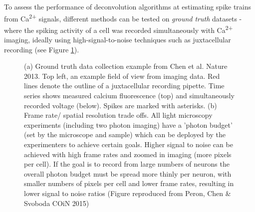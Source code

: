 \documentclass[a4paper]{article}
\begin{document}
To assess the performance of deconvolution algorithms at estimating spike trains from Ca\textsuperscript{2+} signals, different methods can be tested on \emph{ground truth} datasets - where the spiking activity of a cell was recorded simultaneously with Ca\textsuperscript{2+} imaging, ideally using high-signal-to-noise techniques such as juxtacellular recording (see Figure \ref{fig:ground_truth_diagram}).



\begin{figure}%
\centering
{}
\caption{\label{fig:ground_truth_diagram} (a) Ground truth data collection example from Chen et al. Nature 2013. Top left, an example field of view from imaging data. Red lines denote the outline of a juxtacellular recording pipette. Time series shows measured calcium fluorescence (top) and simultaneously recorded voltage (below). Spikes are marked with asterisks. (b) Frame rate/ spatial resolution trade offs. All light microscopy experiments (including two photon imaging) have a 'photon budget' (set by the microscope and sample) which can be deployed by the experimenters to achieve certain goals. Higher signal to noise can be achieved with high frame rates and zoomed in imaging (more pixels per cell). If the goal is to record from large numbers of neurons the overall photon budget must be spread more thinly per neuron, with smaller numbers of pixels per cell and lower frame rates, resulting in lower signal to noise ratios (Figure reproduced from Peron, Chen \& Svoboda COiN 2015)}
\end{figure}
\end{document}
